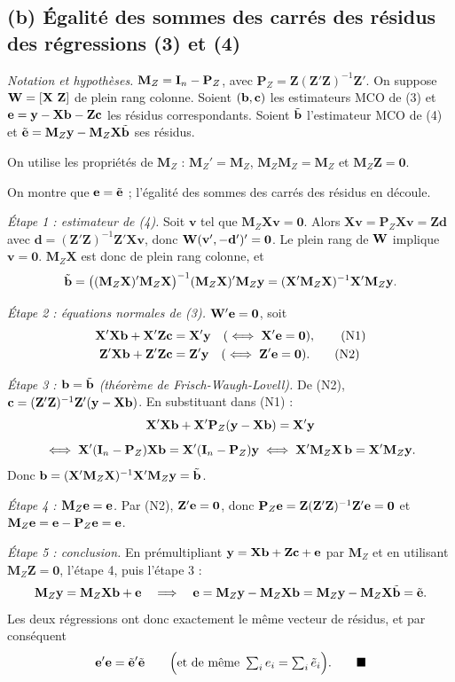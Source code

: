 \documentclass[11pt,a4paper]{article}
\newcommand{\vy}{\mathbf{y}}\newcommand{\vX}{\mathbf{X}}\newcommand{\vZ}{\mathbf{Z}}
\newcommand{\vc}{\mathbf{c}}\newcommand{\vv}{\mathbf{v}}\newcommand{\vd}{\mathbf{d}}
\newcommand{\Mz}{\mathbf{M}_Z}\newcommand{\Pz}{\mathbf{P}_Z}
\begin{document}
\subsection*{(b) Égalité des sommes des carrés des résidus des régressions (3) et (4)}

\textit{Notation et hypothèses.} $\Mz=\I_n-\Pz$, avec $\Pz=\vZ(\vZ'\vZ)^{-1}\vZ'$. On suppose $\W=[\vX\ \vZ]$ de plein rang colonne. Soient $(\vb,\vc)$ les estimateurs MCO de (3) et $\ve=\vy-\vX\vb-\vZ\vc$ les résidus correspondants. Soient $\tilde{\mathbf{b}}$ l'estimateur MCO de (4) et $\tilde{\ve}=\Mz\vy-\Mz\vX\tilde{\vb}$ ses résidus.

On utilise les propriétés de $\Mz$ : $\Mz'=\Mz$, $\Mz\Mz=\Mz$ et $\Mz\vZ=\mathbf 0$.

On montre que $\mathbf{e}=\tilde{\mathbf{e}}$ ; l'égalité des sommes des carrés des résidus en découle.

\textit{Étape 1 : estimateur de (4).} Soit $\vv$ tel que $\Mz\vX\vv=\mathbf 0$. Alors $\vX\vv=\Pz\vX\vv=\vZ\vd$ avec $\vd=(\vZ'\vZ)^{-1}\vZ'\vX\vv$, donc $\W(\vv',-\vd')'=\mathbf 0$. Le plein rang de $\mathbf{W}$ implique $\vv=\mathbf 0$. $\Mz\vX$ est donc de plein rang colonne, et
\[
\tilde{\vb}=\big((\Mz\vX)'\Mz\vX\big)^{-1}(\Mz\vX)'\Mz\vy=(\vX'\Mz\vX)^{-1}\vX'\Mz\vy .
\]

\textit{Étape 2 : équations normales de (3).} $\mathbf{W}'\mathbf{e}=\mathbf 0$, soit
\begin{align}
\vX'\vX\vb+\vX'\vZ\vc&=\vX'\vy \quad(\iff \vX'\ve=\mathbf 0), \tag{N1}\\
\vZ'\vX\vb+\vZ'\vZ\vc&=\vZ'\vy \quad(\iff \vZ'\ve=\mathbf 0). \tag{N2}
\end{align}

\textit{Étape 3 : $\mathbf{b}=\tilde{\mathbf{b}}$ (théorème de Frisch-Waugh-Lovell).} De (N2), $\vc=(\vZ'\vZ)^{-1}\vZ'(\vy-\vX\vb)$. En substituant dans (N1) :
\[
\vX'\vX\vb+\vX'\Pz(\vy-\vX\vb)=\vX'\vy
\]
\[
\iff \vX'(\I_n-\Pz)\vX\vb=\vX'(\I_n-\Pz)\vy
\iff \vX'\Mz\vX\,\vb=\vX'\Mz\vy .
\]
Donc $\vb=(\vX'\Mz\vX)^{-1}\vX'\Mz\vy=\tilde{\vb}$.

\textit{Étape 4 : $\Mz\ve=\ve$.} Par (N2), $\vZ'\ve=\mathbf 0$, donc $\Pz\ve=\vZ(\vZ'\vZ)^{-1}\vZ'\ve=\mathbf 0$ et $\Mz\ve=\ve-\Pz\ve=\ve$.

\textit{Étape 5 : conclusion.} En prémultipliant $\vy=\vX\vb+\vZ\vc+\ve$ par $\Mz$ et en utilisant $\Mz\vZ=\mathbf 0$, l'étape 4, puis l'étape 3 :
\[
\Mz\vy=\Mz\vX\vb+\ve
\quad\Longrightarrow\quad
\ve=\Mz\vy-\Mz\vX\vb=\Mz\vy-\Mz\vX\tilde{\vb}=\tilde{\ve}.
\]
Les deux régressions ont donc exactement le même vecteur de résidus, et par conséquent
\[
\mathbf{e}'\mathbf{e}=\tilde{\mathbf{e}}'\tilde{\mathbf{e}}\qquad\Big(\text{et de même } \textstyle\sum_i e_i=\sum_i\tilde e_i\Big). \qquad\blacksquare
\]
\end{document}
